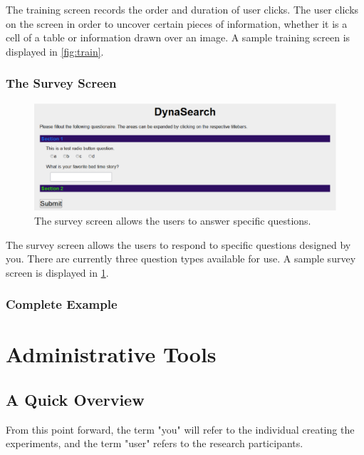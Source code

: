 \documentclass[article]{ij4uq}              %
\begin{document}
The training screen records the order and duration of user clicks. The user clicks on the screen in order to uncover certain pieces of information, whether it is a cell of a table or information drawn over an image. A sample training screen is displayed in \ref{fig:train}.

\subsubsection{The Survey Screen}

\begin{figure}[h!]
 \centering
 \includegraphics[width=5.0in]{figures/survey_page.eps}
 \caption{The survey screen allows the users to answer specific questions.}
 \label{fig:survey}
\end{figure}
\FloatBarrier

The survey screen allows the users to respond to specific questions designed by you. There are currently three question types available for use. A sample survey screen is displayed in \ref{fig:survey}.

\subsubsection{Complete Example}



\section{Administrative Tools}

\subsection{A Quick Overview}
From this point forward, the term "you" will refer to the individual creating the experiments, and the term "user" refers to the research participants. 
\end{document}
